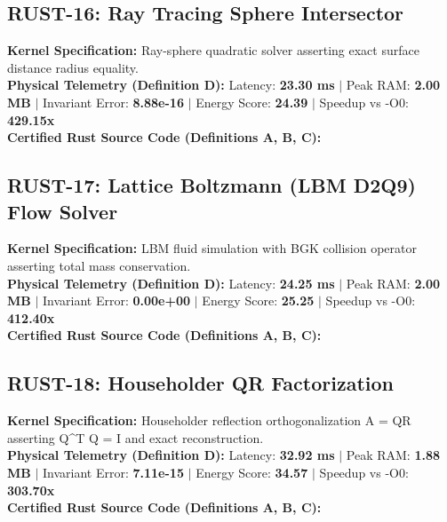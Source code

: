 \subsection{RUST-16: Ray Tracing Sphere Intersector}
\textbf{Kernel Specification:} Ray-sphere quadratic solver asserting exact surface distance radius equality.\\
\textbf{Physical Telemetry (Definition D):} Latency: \textbf{23.30 ms} $|$ Peak RAM: \textbf{2.00 MB} $|$ Invariant Error: \textbf{8.88e-16} $|$ Energy Score: \textbf{24.39} $|$ Speedup vs -O0: \textbf{429.15x}\\

\textbf{Certified Rust Source Code (Definitions A, B, C):}


\vspace{1em}
\subsection{RUST-17: Lattice Boltzmann (LBM D2Q9) Flow Solver}
\textbf{Kernel Specification:} LBM fluid simulation with BGK collision operator asserting total mass conservation.\\
\textbf{Physical Telemetry (Definition D):} Latency: \textbf{24.25 ms} $|$ Peak RAM: \textbf{2.00 MB} $|$ Invariant Error: \textbf{0.00e+00} $|$ Energy Score: \textbf{25.25} $|$ Speedup vs -O0: \textbf{412.40x}\\

\textbf{Certified Rust Source Code (Definitions A, B, C):}


\vspace{1em}
\subsection{RUST-18: Householder QR Factorization}
\textbf{Kernel Specification:} Householder reflection orthogonalization A = QR asserting Q\textasciicircum{}T Q = I and exact reconstruction.\\
\textbf{Physical Telemetry (Definition D):} Latency: \textbf{32.92 ms} $|$ Peak RAM: \textbf{1.88 MB} $|$ Invariant Error: \textbf{7.11e-15} $|$ Energy Score: \textbf{34.57} $|$ Speedup vs -O0: \textbf{303.70x}\\

\textbf{Certified Rust Source Code (Definitions A, B, C):}


\vspace{1em}
